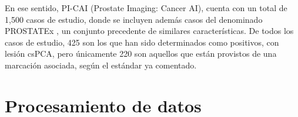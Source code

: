 En ese sentido, PI-CAI (Prostate Imaging: Cancer AI), cuenta con un total de 1,500 casos de estudio, donde se incluyen además casos del denominado PROSTATEx \cite{Prostatex}, un conjunto precedente de similares características. De todos los casos de estudio, 425 son los que han sido determinados como positivos, con lesión csPCA, pero únicamente 220 son aquellos que están provistos de una marcación asociada, según el estándar ya comentado.




\section{Procesamiento de datos}

